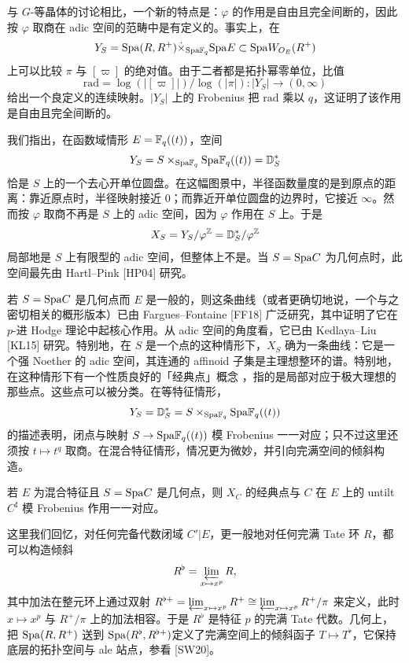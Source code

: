 与 $G$-等晶体的讨论相比，一个新的特点是：$\varphi$ 的作用是自由且完全间断的，因此按 $\varphi$ 取商在 adic 空间的范畴中是有定义的。事实上，在
\[
  Y_S = \mathrm{Spa}(R,R^+)\dot\times_{\mathrm{Spa}\mathbb{F}_q}\mathrm{Spa} E \subset \mathrm{Spa} W_{O_E}(R^+)
\]
上可以比较 $\pi$ 与 $[\varpi]$ 的绝对值。由于二者都是拓扑幂零单位，比值
\[
  \mathrm{rad} = \log(|[\varpi]|)/\log(|\pi|) : |Y_S| \to (0,\infty)
\]
给出一个良定义的连续映射。$|Y_S|$ 上的 Frobenius 把 $\mathrm{rad}$ 乘以 $q$，这证明了该作用是自由且完全间断的。

我们指出，在函数域情形 $E=\mathbb{F}_q((t))$，空间
\[
  Y_S = S\times_{\mathrm{Spa}\mathbb{F}_q}\mathrm{Spa}\mathbb{F}_q((t)) = \mathbb{D}^*_S
\]
恰是 $S$ 上的一个去心开单位圆盘。在这幅图景中，半径函数量度的是到原点的距离：靠近原点时，半径映射接近 $0$；而靠近开单位圆盘的边界时，它接近 $\infty$。然而按 $\varphi$ 取商不再是 $S$ 上的 adic 空间，因为 $\varphi$ 作用在 $S$ 上。于是
\[
  X_S = Y_S/\varphi^{\mathbb{Z}} = \mathbb{D}^*_S/\varphi^{\mathbb{Z}}
\]
局部地是 $S$ 上有限型的 adic 空间，但整体上不是。当 $S=\mathrm{Spa} C$ 为几何点时，此空间最先由 Hartl–Pink [HP04] 研究。

若 $S=\mathrm{Spa} C$ 是几何点而 $E$ 是一般的，则这条曲线（或者更确切地说，一个与之密切相关的概形版本）已由 Fargues–Fontaine [FF18] 广泛研究，其中证明了它在 $p$-进 Hodge 理论中起核心作用。从 adic 空间的角度看，它已由 Kedlaya–Liu [KL15] 研究。特别地，在 $S$ 是一个点的这种情形下，$X_S$ 确为一条曲线：它是一个强 Noether 的 adic 空间，其连通的 affinoid 子集是主理想整环的谱。特别地，在这种情形下有一个性质良好的「经典点」概念
，指的是局部对应于极大理想的那些点。这些点可以被分类。在等特征情形，
\[
  Y_S = \mathbb{D}^*_S = S\times_{\mathrm{Spa}\mathbb{F}_q}\mathrm{Spa}\mathbb{F}_q((t))
\]
的描述表明，闭点与映射 $S\to\mathrm{Spa}\mathbb{F}_q((t))$ 模 Frobenius 一一对应；只不过这里还须按 $t\mapsto t^q$ 取商。在混合特征情形，情况更为微妙，并引向完满空间的倾斜构造。

\begin{proposition}%
若 $E$ 为混合特征且 $S=\mathrm{Spa} C$ 是几何点，则 $X_C$ 的经典点与 $C$ 在 $E$ 上的 untilt $C^\sharp$ 模 Frobenius 作用一一对应。
\end{proposition}

这里我们回忆，对任何完备代数闭域 $C'|E$，更一般地对任何完满 Tate 环 $R$，都可以构造倾斜
\[
  R^\flat = \varprojlim_{x\mapsto x^p} R,
\]
其中加法在整元环上通过双射 $R^{\flat+}=\varprojlim_{x\mapsto x^p}R^+\cong\varprojlim_{x\mapsto x^p}R^+/\pi$ 来定义，此时 $x\mapsto x^p$ 与 $R^+/\pi$ 上的加法相容。于是 $R^\flat$ 是特征 $p$ 的完满 Tate 代数。几何上，把 $\mathrm{Spa}(R,R^+)$ 送到 $\mathrm{Spa}(R^\flat,R^{\flat+})$定义了完满空间上的倾斜函子 $T\mapsto T^\flat$，它保持底层的拓扑空间与 ale 站点，参看 [SW20]。

